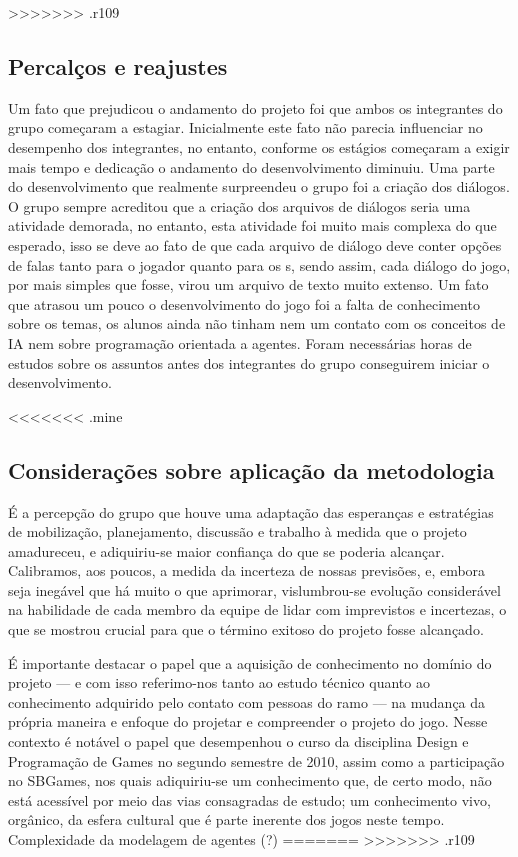 >>>>>>> .r109
\subsection{Percalços e reajustes}

Um fato que prejudicou o andamento do projeto foi que ambos os integrantes do grupo começaram a estagiar. Inicialmente este fato não parecia influenciar no desempenho dos integrantes, no entanto, conforme os estágios começaram a exigir mais tempo e dedicação o andamento do desenvolvimento diminuiu.
Uma parte do desenvolvimento que realmente surpreendeu o grupo foi a criação dos diálogos. O grupo sempre acreditou que a criação dos arquivos de diálogos seria uma atividade demorada, no entanto, esta atividade foi muito mais complexa do que esperado, isso se deve ao fato de que cada arquivo de diálogo deve conter opções de falas tanto para o jogador quanto para os \npc{}s, sendo assim, cada diálogo do jogo, por mais simples que fosse, virou um arquivo de texto muito extenso.
Um fato que atrasou um pouco o desenvolvimento do jogo foi a falta de conhecimento sobre os temas, os alunos ainda não tinham nem um contato com os conceitos de IA nem sobre programação orientada a agentes. Foram necessárias horas de estudos sobre os assuntos antes dos integrantes do grupo conseguirem iniciar o desenvolvimento.

<<<<<<< .mine


\subsection{Considerações sobre aplicação da metodologia}

É a percepção do grupo que houve uma adaptação das esperanças e estratégias de mobilização, planejamento, discussão e trabalho à medida que o projeto amadureceu, e adiquiriu-se maior confiança do que se poderia alcançar. Calibramos, aos poucos, a medida da incerteza de nossas previsões, e, embora seja inegável que há muito o que aprimorar, vislumbrou-se evolução considerável na habilidade de cada membro da equipe de lidar com imprevistos e incertezas, o que se mostrou crucial para que o término exitoso do projeto fosse alcançado.

É importante destacar o papel que a aquisição de conhecimento no domínio do projeto --- e com isso referimo-nos tanto ao estudo técnico quanto ao conhecimento adquirido pelo contato com pessoas do ramo --- na mudança da própria maneira e enfoque do projetar e compreender o projeto do jogo. Nesse contexto é notável o papel que desempenhou o curso da disciplina Design e Programação de Games no segundo semestre de 2010, assim como a participação no SBGames, nos quais adiquiriu-se um conhecimento que, de certo modo, não está acessível por meio das vias consagradas de estudo; um conhecimento vivo, orgânico, da esfera cultural que é parte inerente dos jogos neste tempo.
Complexidade da modelagem de agentes (?)
=======
>>>>>>> .r109

